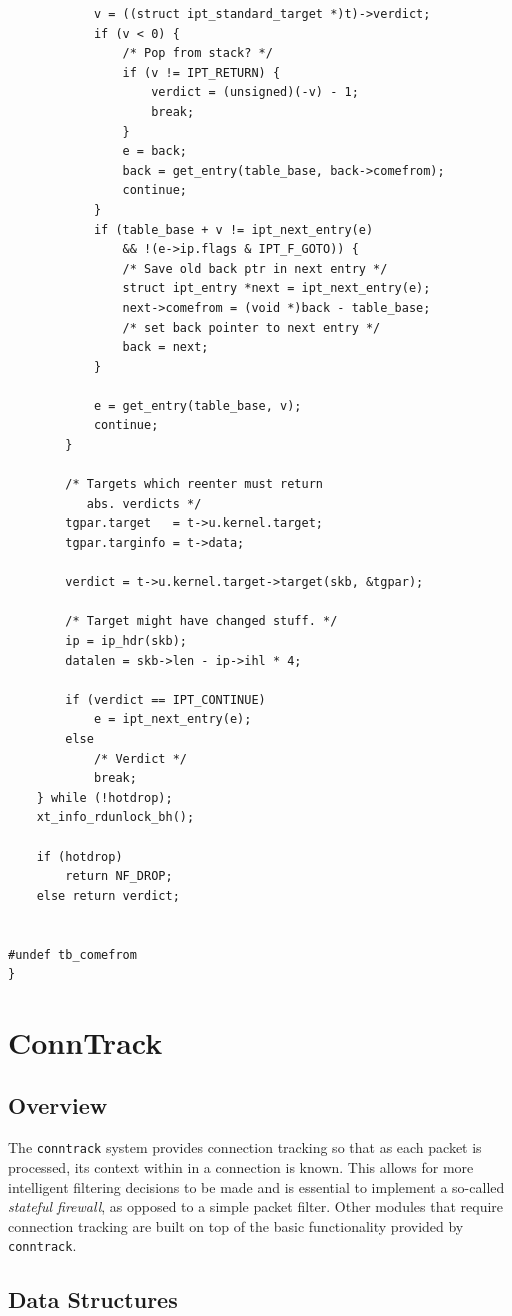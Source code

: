 \documentclass[a4paper,10pt]{article}
\begin{document}
\begin{lstlisting}
			v = ((struct ipt_standard_target *)t)->verdict;
			if (v < 0) {
				/* Pop from stack? */
				if (v != IPT_RETURN) {
					verdict = (unsigned)(-v) - 1;
					break;
				}
				e = back;
				back = get_entry(table_base, back->comefrom);
				continue;
			}
			if (table_base + v != ipt_next_entry(e)
			    && !(e->ip.flags & IPT_F_GOTO)) {
				/* Save old back ptr in next entry */
				struct ipt_entry *next = ipt_next_entry(e);
				next->comefrom = (void *)back - table_base;
				/* set back pointer to next entry */
				back = next;
			}

			e = get_entry(table_base, v);
			continue;
		}

		/* Targets which reenter must return
		   abs. verdicts */
		tgpar.target   = t->u.kernel.target;
		tgpar.targinfo = t->data;

		verdict = t->u.kernel.target->target(skb, &tgpar);

		/* Target might have changed stuff. */
		ip = ip_hdr(skb);
		datalen = skb->len - ip->ihl * 4;

		if (verdict == IPT_CONTINUE)
			e = ipt_next_entry(e);
		else
			/* Verdict */
			break;
	} while (!hotdrop);
	xt_info_rdunlock_bh();

	if (hotdrop)
		return NF_DROP;
	else return verdict;


#undef tb_comefrom
}
\end{lstlisting}
\lstset{stepnumber=1}

\section{ConnTrack}\label{conntrack}

\subsection{Overview}
The \verb|conntrack| system provides connection tracking so that as each packet is processed, its context within in a connection is known. This allows for more intelligent filtering decisions to be made and is essential to implement a so-called \textit{stateful firewall}, as opposed to a simple packet filter. Other modules that require connection tracking are built on top of the basic functionality provided by \verb|conntrack|.

\subsection{Data Structures}
\end{document}
